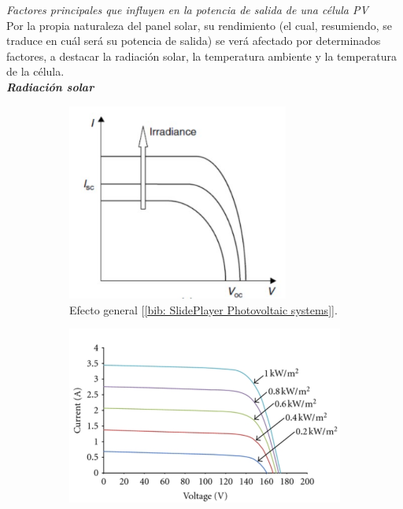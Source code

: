 \documentclass[12pt]{article}
\begin{document}
	\noindent \textit{Factores principales que influyen en la potencia de salida de una célula PV}\\
	
	\noindent Por la propia naturaleza del panel solar, su rendimiento (el cual, resumiendo, se traduce en cuál será su potencia de salida) se verá afectado por determinados factores, a destacar la radiación solar, la temperatura ambiente y la temperatura de la célula. \\
	
	\noindent \textit{\textbf{Radiación solar}}
	\begin{figure}[h!]
		\begin{subfigure}{0.45\textwidth}
			\includegraphics[width=0.8\textwidth]{img/generalEffect_irradianceIVcurve_solarCell.png} 
			\caption{Efecto general [\ref{bib: SlidePlayer Photovoltaic systems}].}
			\label{fig: variación general en la curva I-V de una célula PV con la intensidad de la radiación solar.}
		\end{subfigure}
		\begin{subfigure}{0.5\textwidth}
			\includegraphics[width=1.05\linewidth]{img/concreteEffect_irradianceIVcurve_solarCell.png}

\end{subfigure}
\end{figure}
\end{document}
